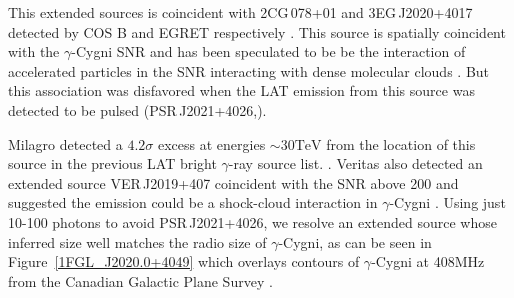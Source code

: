 \documentclass[12pt,preprint]{aastex}
\newcommand{\gev}{\text{GeV}\xspace}
\newcommand{\tev}{\text{TeV}\xspace}
\newcommand{\hl}[1]{#1}
\begin{document}
\hl{
This extended sources is coincident with 2CG\,078+01 and
3EG\,J2020+4017 detected by COS B and EGRET respectively
\citep{second_cos_b_catalog,third_egret_catalog}.  This source is
spatially coincident with the $\gamma$-Cygni SNR and has been speculated
to be be the interaction of accelerated particles in the SNR interacting
with dense molecular clouds \citep{pollock_1985,gaisser_1998}.  But this
association was disfavored when the LAT \gev emission from this source
was detected to be pulsed 
(PSR\,J2021+4026,\cite{first_lat_pulsar_cat}).

Milagro detected a $4.2\sigma$
excess at energies $\sim 30 \tev$ from the location of
this source in the previous LAT bright $\gamma$-ray source
list. \cite{lat_bsl,milagro_bright_source_list}.  Veritas also detected
an extended source VER\,J2019+407 coincident with the SNR above 200
\gev and suggested the \tev emission could be a shock-cloud interaction
in $\gamma$-Cygni \citep{veritas_gamma_cygni}.  Using just 10-100
\gev photons to avoid PSR\,J2021+4026, we resolve an
extended source whose inferred \gev size well matches the radio size of
$\gamma$-Cygni, as can be seen in Figure~\ref{1FGL_J2020.0+4049}
which overlays contours of $\gamma$-Cygni at 408MHz from the Canadian
Galactic Plane Survey \citep{canadian_galactic_plane_survey}.
}



\end{document}
